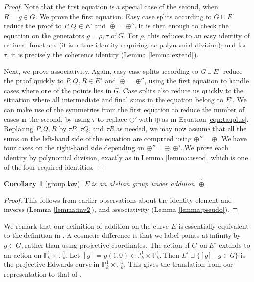 \documentclass[12pt]{article}
\newtheorem{corollary}[theorem]{Corollary}
\newcommand{\ring}[1]{\mathbb{#1}}
\newcommand{\Eoo}{E^{\circ}}
\newcommand{\hplus}{\hat\oplus}
\begin{document}
\begin{proof}  
  Note that the first equation is a special case of the second, when
  $R=g\in G$.  We prove the first equation.  Easy case splits
  according to $G\sqcup \Eoo$ reduce the proof to $P,Q\in \Eoo$ and
  $\hplus =\oplus''$.  It is then enough to check the equation on the
  generators $g=\rho,\tau$ of $G$.  For $\rho$, this reduces to an easy
  identity of rational functions 
  (it is a true identity requiring no polynomial division);
  and for $\tau$, it is precisely the coherence identity (Lemma \ref{lemma:extend}).

  Next, we prove associativity.  Again, easy case splits
  according to $G\sqcup \Eoo$ reduce the proof quickly to $P,Q,R\in
  \Eoo$ and $\hplus = \oplus''$, using the first equation to handle
  cases where one of the points lies in $G$.  Case splits also reduce
  us quickly to the situation where all intermediate and final sums in
  the equation belong to $\Eoo$.  We can make use of the symmetries
  from the first equation to reduce the number of cases in the second,
  by using $\tau$ to replace $\oplus'$ with $\oplus$ as in Equation
  \ref{eqn:tauplus}.  Replacing $P,Q,R$ by $\tau P$, $\tau Q$, and $\tau
  R$ as needed, we may now assume that all the sums on the left-hand
  side of the equation are computed using
  $\oplus''=\oplus$.  We have four cases on the right-hand side depending on
  $\oplus'' =\oplus,\oplus'$.  We prove each identity by polynomial
  division, exactly as in Lemma \ref{lemma:assoc}, which is one of the
  four required identities.
\end{proof}

\begin{corollary}[group law] $E$ is an abelian group under addition $\hplus$.
\end{corollary}

\begin{proof} This follows from earlier observations about the 
  identity element and inverse (Lemma \ref{lemma:inv2}),
  and associativity (Lemma \ref{lemma:pseudo}).
\end{proof}

We remark that our definition of addition on the curve $E$ is
essentially equivalent to the definition in
\cite{bernstein2011complete}.  A cosmetic difference is that we label
points at infinity by $g\in G$, rather than using projective
coordinates.  The action of $G$ on $\Eoo$ extends to an action on
$\ring{P}^1_k\times \ring{P}^1_k$.  Let $[g] = g (1,0)\in
\ring{P}^1_k\times \ring{P}^1_k$.  Then $\Eoo\sqcup \{[g]\mid g\in
G\}$ is the projective Edwards curve in $\ring{P}^1_k\times \ring{P}^1_k$.
This gives the translation from our representation to that of
\cite{bernstein2011complete}.
\end{document}
